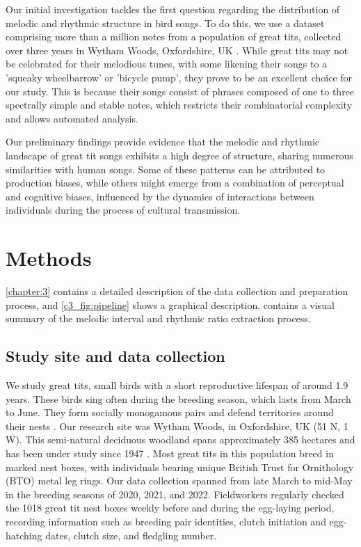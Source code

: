 Our initial investigation tackles the first question regarding the distribution of melodic and rhythmic structure in bird songs. To do this, we use a dataset comprising more than a million notes from a population of great tits, collected over three years in Wytham Woods, Oxfordshire, UK \autocite{merinorecalde2023a}. While great tits may not be celebrated for their melodious tunes, with some likening their songs to a 'squeaky wheelbarrow' or 'bicycle pump', they prove to be an excellent choice for our study. This is because their songs consist of phrases composed of one to three spectrally simple and stable notes, which restricts their combinatorial complexity and allows automated analysis.

Our preliminary findings provide evidence that the melodic and rhythmic landscape of great tit songs exhibits a high degree of structure, sharing numerous similarities with human songs. Some of these patterns can be attributed to production biases, while others might emerge from a combination of perceptual and cognitive biases, influenced by the dynamics of interactions between individuals during the process of cultural transmission.

\section{Methods}
\label{c5:methods}

\autoref{chapter:3} contains a detailed description of the data collection and preparation process, and \autoref{c3_fig:pipeline} shows a graphical description.  contains a visual summary of the melodic interval and rhythmic ratio extraction process.

\subsection{Study site and data collection}
We study great tits, small birds with a short reproductive lifespan of around 1.9 years. These birds sing often during the breeding season, which lasts from March to June. They form socially monogamous pairs and defend territories around their nests \parencite{hinde1952}. Our research site was Wytham Woods, in Oxfordshire, UK (51 N, 1 W). This semi-natural deciduous woodland spans approximately 385 hectares and has been under study since 1947 \parencite{lack1964}. Most great tits in this population breed in marked nest boxes, with individuals bearing unique British Trust for Ornithology (BTO) metal leg rings. Our data collection spanned from late March to mid-May in the breeding seasons of 2020, 2021, and 2022. Fieldworkers regularly checked the 1018 great tit nest boxes weekly before and during the egg-laying period, recording information such as breeding pair identities, clutch initiation and egg-hatching dates, clutch size, and fledgling number.

